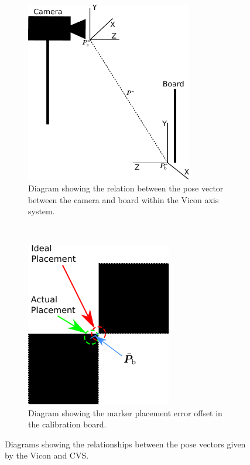 \begin{figure}
  \centering
    \begin{subfigure}[t]{0.48\textwidth}
    \includegraphics[width=0.8\textwidth]{figures/chapter3/P_star}
    \caption{Diagram showing the relation between the pose vector between the camera and board within the Vicon axis system.}
    \label{fig:chap3-p-star}
  \end{subfigure}
  ~
  \begin{subfigure}[t]{0.48\textwidth}
    \includegraphics[width=0.7\textwidth]{figures/chapter3/P_bar}
    \caption{Diagram showing the marker placement error offset in the calibration board. }
    \label{fig:chap3-p-bar}
  \end{subfigure}
\caption{Diagrams showing the relationships between the pose vectors given by the Vicon and CVS.}
\end{figure}

